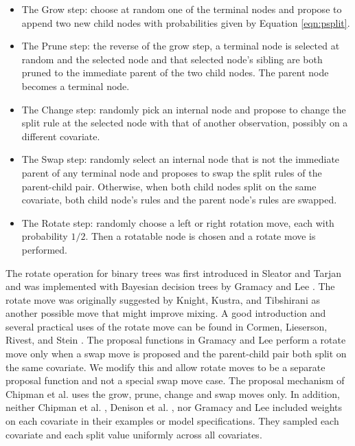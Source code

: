 \begin{itemize}
 \item The Grow step: choose at random one of the terminal nodes and propose to append two new child nodes with probabilities given by Equation \ref{eqn:psplit}. 
 \item The Prune step: the reverse of the grow step, a terminal node is selected at random and the selected node and that selected node's sibling are both pruned to the immediate parent of the two child nodes. The parent node becomes a terminal node. 
 \item The Change step: randomly pick an internal node and propose to change the split rule at the selected node with that of another observation, possibly on a different covariate.
  \item The Swap step: randomly select an internal node that is not the immediate parent of any terminal node and proposes to swap the split rules of the parent-child pair. Otherwise, when both child nodes split on the same covariate, both child node's rules and the parent node's rules are swapped.
  \item The Rotate step: randomly choose a left or right rotation move, each with probability $1/2$. Then a rotatable node is chosen and a rotate move is performed.
 \end{itemize}
  The rotate operation for binary trees was first introduced in Sleator and Tarjan \cite{sleator1985self} and was implemented with Bayesian decision trees by Gramacy and Lee \cite{gramacy2008bayesian}. The rotate move was originally suggested by Knight, Kustra, and Tibshirani \cite{knight1998bayesian} as another possible move that might improve mixing. A good introduction and several practical uses of the rotate move can be found in Cormen, Lieserson, Rivest, and Stein \cite{cormen2001introduction}. The proposal functions in Gramacy and Lee \cite{gramacy2008bayesian} perform a rotate move only when a swap move is proposed and the parent-child pair both split on the same covariate. We modify this and allow rotate moves to be a separate proposal function and not a special swap move case. The proposal mechanism of Chipman et al. uses the grow, prune, change and swap moves only. In addition, neither Chipman et al. \cite{chipman1998bayesian}, Denison et al. \cite{denison1998bayesian}, nor Gramacy and Lee \cite{gramacy2008bayesian} included weights on each covariate in their examples or model specifications. They sampled each covariate and each split value uniformly across all covariates. 

